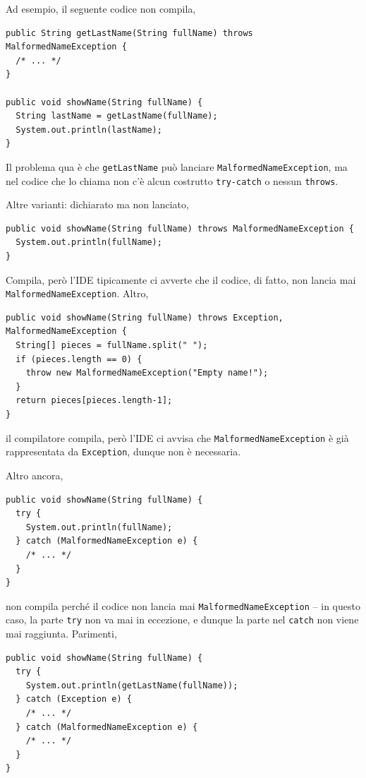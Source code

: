 \documentclass[\fontsizeclass,twocolumn]{\classname}
\let\oldtextsc\textsc
\renewcommand{\textsc}[1]{\oldtextsc{\scfontfs #1}}
\theoremstyle{definition}
\theoremstyle{definition}
\begin{document}
Ad esempio, il seguente codice non compila,

\begin{lstlisting}
public String getLastName(String fullName) throws MalformedNameException {
  /* ... */
}

public void showName(String fullName) {
  String lastName = getLastName(fullName);
  System.out.println(lastName);
}
\end{lstlisting}

Il problema qua è che \texttt{getLastName} può lanciare
\texttt{MalformedNameException}, ma nel codice che lo chiama non c'è alcun
costrutto \texttt{try\--catch} o nessun \texttt{throws}.

Altre varianti: dichiarato ma non lanciato,

\begin{lstlisting}
public void showName(String fullName) throws MalformedNameException {
  System.out.println(fullName);
}
\end{lstlisting}

Compila, però l'\textsc{IDE} tipicamente ci avverte che il codice, di fatto, non lancia
mai \texttt{MalformedNameException}. Altro,

\begin{lstlisting}
public void showName(String fullName) throws Exception, MalformedNameException {
  String[] pieces = fullName.split(" ");
  if (pieces.length == 0) {
    throw new MalformedNameException("Empty name!");
  }
  return pieces[pieces.length-1];
}
\end{lstlisting}

il compilatore compila, però l'\textsc{IDE} ci avvisa che
\texttt{MalformedNameException} è già rappresentata da \texttt{Exception},
dunque non è necessaria.

Altro ancora,

\begin{lstlisting}
public void showName(String fullName) {
  try {
    System.out.println(fullName);
  } catch (MalformedNameException e) {
    /* ... */
  }
}
\end{lstlisting}

non compila perché il codice non lancia mai \texttt{MalformedNameException} --
in questo caso, la parte \texttt{try} non va mai in eccezione, e dunque la
parte nel \texttt{catch} non viene mai raggiunta. Parimenti,

\begin{lstlisting}
public void showName(String fullName) {
  try {
    System.out.println(getLastName(fullName));
  } catch (Exception e) {
    /* ... */
  } catch (MalformedNameException e) {
    /* ... */
  }
}
\end{lstlisting}
\end{document}

